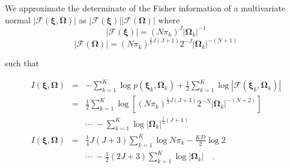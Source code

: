 \documentclass[twocolumn]{aastex62}
\newcommand{\vect}[1]{\boldsymbol{\mathbf{#1}}}
\renewcommand{\vec}[1]{\vect{#1}}
\newcommand{\weight}{\pi}
\newcommand{\scoremeans}{\vec\xi}
\newcommand{\scorecovs}{\vec\Omega}
\newcommand{\NumData}{N}
\newcommand{\NumLatentFactors}{J}
\newcommand{\NumComponents}{K}
\newcommand{\numcomponents}{k}
\begin{document}
We approximate the determinate of the Fisher information of a multivariate normal $|\mathcal{F}(\scoremeans,\scorecovs)|$
as $|\mathcal{F}(\scoremeans)||\mathcal{F}(\scorecovs)|$ \citep{Oliver:1996,Figueiredo:2002} where
\begin{equation}
	|\mathcal{F}(\scoremeans)| = (\NumData\weight_k)^\NumLatentFactors|\scorecovs_k|^{-1}
\end{equation}
\begin{equation}
	|\mathcal{F}(\scorecovs)| = (\NumData\weight_k)^{\frac{1}{2}\NumLatentFactors(\NumLatentFactors+1)}2^{-\NumLatentFactors}|\scorecovs_k|^{-(\NumData+1)}
\end{equation}

\noindent{}such that 

\begin{eqnarray}
	I(\scoremeans,\scorecovs) &=& -\sum_{\numcomponents=1}^{\NumComponents}\log{p(\scoremeans_k,\scorecovs_k)} + \frac{1}{2}\sum_{\numcomponents=1}^{\NumComponents}\log{|\mathcal{F}(\scoremeans_k,\scorecovs_k)|} \nonumber \\
	&=& \frac{1}{2}\sum_{\numcomponents=1}^{\NumComponents}\log\left[(\NumData\weight_k)^{\frac{1}{2}\NumLatentFactors(\NumLatentFactors+3)}2^{-\NumData}|\scorecovs_k|^{-(\NumData + 2)}\right] \nonumber \\
	&& \cdots \,\, -\sum_{\numcomponents=1}^{\NumComponents}\log{|\scorecovs_k|}^{\frac{1}{2}(\NumLatentFactors + 1)} \\
I(\scoremeans,\scorecovs) &=& \frac{1}{4}\NumLatentFactors(\NumLatentFactors+3)\sum_{\numcomponents=1}^\NumComponents\log{\NumData\weight_k} - \frac{KD}{2}\log{2} \nonumber \\ 
&& \cdots \,\, -\frac{1}{2}(2\NumLatentFactors+3)\sum_{k=1}^{K}\log{|\scorecovs_k|}  \quad . \label{eq:prior_xi_omega} 
\end{eqnarray}
\end{document}
